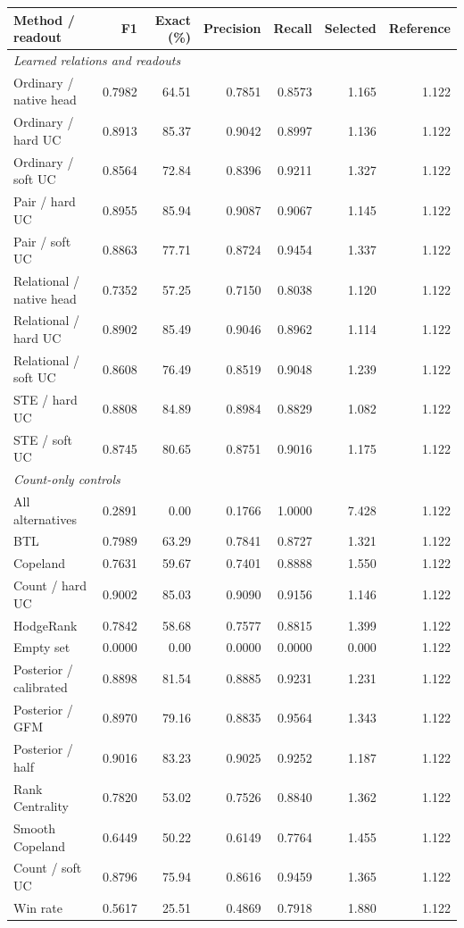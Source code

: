 \begin{tabular*}{\linewidth}{@{\extracolsep{\fill}}lrrrrrr@{}}\toprule
Method / readout & F1 & Exact (\%) & Precision & Recall & Selected & Reference\\\midrule
\multicolumn{7}{l}{\textit{Learned relations and readouts}}\\
Ordinary / native head & 0.7982 & 64.51 & 0.7851 & 0.8573 & 1.165 & 1.122\\
Ordinary / hard UC & 0.8913 & 85.37 & 0.9042 & 0.8997 & 1.136 & 1.122\\
Ordinary / soft UC & 0.8564 & 72.84 & 0.8396 & 0.9211 & 1.327 & 1.122\\
Pair / hard UC & 0.8955 & 85.94 & 0.9087 & 0.9067 & 1.145 & 1.122\\
Pair / soft UC & 0.8863 & 77.71 & 0.8724 & 0.9454 & 1.337 & 1.122\\
Relational / native head & 0.7352 & 57.25 & 0.7150 & 0.8038 & 1.120 & 1.122\\
Relational / hard UC & 0.8902 & 85.49 & 0.9046 & 0.8962 & 1.114 & 1.122\\
Relational / soft UC & 0.8608 & 76.49 & 0.8519 & 0.9048 & 1.239 & 1.122\\
STE / hard UC & 0.8808 & 84.89 & 0.8984 & 0.8829 & 1.082 & 1.122\\
STE / soft UC & 0.8745 & 80.65 & 0.8751 & 0.9016 & 1.175 & 1.122\\
\midrule\multicolumn{7}{l}{\textit{Count-only controls}}\\
All alternatives & 0.2891 & 0.00 & 0.1766 & 1.0000 & 7.428 & 1.122\\
BTL & 0.7989 & 63.29 & 0.7841 & 0.8727 & 1.321 & 1.122\\
Copeland & 0.7631 & 59.67 & 0.7401 & 0.8888 & 1.550 & 1.122\\
Count / hard UC & 0.9002 & 85.03 & 0.9090 & 0.9156 & 1.146 & 1.122\\
HodgeRank & 0.7842 & 58.68 & 0.7577 & 0.8815 & 1.399 & 1.122\\
Empty set & 0.0000 & 0.00 & 0.0000 & 0.0000 & 0.000 & 1.122\\
Posterior / calibrated & 0.8898 & 81.54 & 0.8885 & 0.9231 & 1.231 & 1.122\\
Posterior / GFM & 0.8970 & 79.16 & 0.8835 & 0.9564 & 1.343 & 1.122\\
Posterior / half & 0.9016 & 83.23 & 0.9025 & 0.9252 & 1.187 & 1.122\\
Rank Centrality & 0.7820 & 53.02 & 0.7526 & 0.8840 & 1.362 & 1.122\\
Smooth Copeland & 0.6449 & 50.22 & 0.6149 & 0.7764 & 1.455 & 1.122\\
Count / soft UC & 0.8796 & 75.94 & 0.8616 & 0.9459 & 1.365 & 1.122\\
Win rate & 0.5617 & 25.51 & 0.4869 & 0.7918 & 1.880 & 1.122\\
\bottomrule\end{tabular*}

